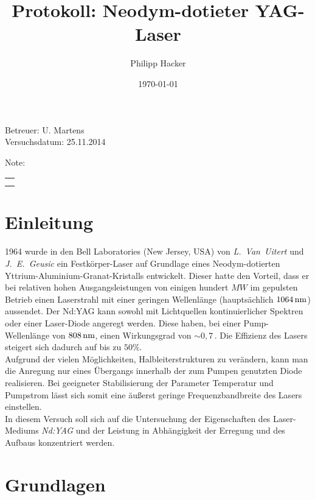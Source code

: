 \documentclass[numbers=noenddot,12pt,a4paper]{scrartcl}
\title{Protokoll: Neodym-dotieter YAG-Laser} %
\author{Philipp Hacker} %
\date{\today}
\newcommand{\tilt}[1]{\mbox{\textit{#1}}}
\begin{document}
\maketitle
\begin{center}
Betreuer: U. Martens\\ %
Versuchsdatum: 25.11.2014\\ %
\begin{table}[h]
\centering
Note: %
\begin{tabularx}{1.5cm}{|X|}
\hline \\ \\
\hline
\end{tabularx}
\end{table}
\end{center}
\vspace*{\fill}
\tableofcontents
\vfill
\newpage
\section{Einleitung}
1964 wurde in den Bell Laboratories (New Jersey, USA) von \tilt{L. Van Uitert} und \tilt{J. E. Geusic} ein Festkörper-Laser auf Grundlage eines Neodym-dotierten Yttrium-Aluminium-Granat-Kristalls entwickelt. Dieser hatte den Vorteil, dass er bei relativen hohen Ausgangsleistungen von einigen hundert $\unit{MW}$ im gepulsten Betrieb einen Laserstrahl mit einer geringen Wellenlänge (hauptsächlich $\unit[1064]{nm}$) aussendet. Der Nd:YAG kann sowohl mit Lichtquellen kontinuierlicher Spektren oder einer Laser-Diode angeregt werden. Diese haben, bei einer Pump-Wellenlänge von $\unit[808]{nm}$, einen Wirkungsgrad von $\sim0,7\,$. Die Effizienz des Lasers steigert sich dadurch auf bis zu $50\%$.\\ Aufgrund der vielen Möglichkeiten, Halbleiterstrukturen zu verändern, kann man die Anregung nur eines Übergangs innerhalb der zum Pumpen genutzten Diode realisieren. Bei geeigneter Stabilisierung der Parameter Temperatur und Pumpstrom lässt sich somit eine äußerst geringe Frequenzbandbreite des Lasers einstellen. \\
In diesem Versuch soll sich auf die Untersuchung der Eigenschaften des Laser-Mediums \tilt{Nd:YAG} und der Leistung in Abhängigkeit der Erregung und des Aufbaus konzentriert werden.
\newpage
\section{Grundlagen}
\end{document}
